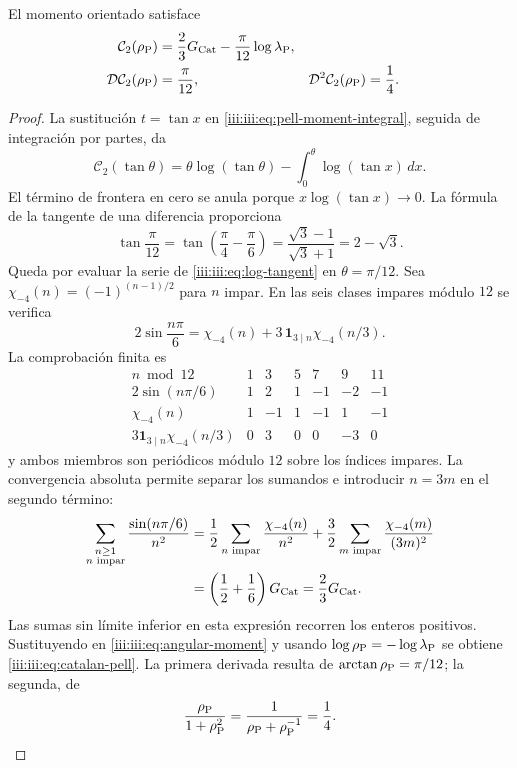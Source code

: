 \begin{theorem}
\label{iii:iii:thm:catalan-pell}
El momento orientado satisface
\begin{align}
 \mathcal C_2(\rho_{\rm P})
 &=\frac23G_{\rm Cat}-\frac{\pi}{12}\log\lambda_{\rm P},
 \label{iii:iii:eq:catalan-pell}\\
 \mathcal D\mathcal C_2(\rho_{\rm P})&=\frac{\pi}{12},&
 \mathcal D^2\mathcal C_2(\rho_{\rm P})&=\frac14.
 \label{iii:iii:eq:catalan-pell-derivatives}
\end{align}
\end{theorem}
\begin{proof}
La sustitución $t=\tan x$ en \eqref{iii:iii:eq:pell-moment-integral},
seguida de integración por partes, da
\begin{equation}
 \mathcal C_2(\tan\theta)
 =\theta\log(\tan\theta)
   -\int_0^\theta\log(\tan x)\,dx.
 \label{iii:iii:eq:angular-moment}
\end{equation}
El término de frontera en cero se anula porque $x\log(\tan x)\to0$.
La fórmula de la tangente de una diferencia proporciona
\[
 \tan\frac{\pi}{12}
 =\tan\left(\frac\pi4-\frac\pi6\right)
 =\frac{\sqrt3-1}{\sqrt3+1}=2-\sqrt3.
\]
Queda por evaluar la serie de \eqref{iii:iii:eq:log-tangent} en
$\theta=\pi/12$. Sea $\chi_{-4}(n)=(-1)^{(n-1)/2}$ para $n$ impar.
En las seis clases impares módulo $12$ se verifica
\begin{equation}
 2\sin\frac{n\pi}{6}
 =\chi_{-4}(n)+3\,\mathbf1_{3\mid n}\chi_{-4}(n/3).
 \label{iii:iii:eq:character-pell}
\end{equation}
La comprobación finita es
\[
\begin{array}{c|rrrrrr}
 n\bmod12&1&3&5&7&9&11\\ \hline
 2\sin(n\pi/6)&1&2&1&-1&-2&-1\\
 \chi_{-4}(n)&1&-1&1&-1&1&-1\\
 3\mathbf1_{3\mid n}\chi_{-4}(n/3)&0&3&0&0&-3&0
\end{array}
\]
y ambos miembros son periódicos módulo $12$ sobre los índices impares.
La convergencia absoluta permite separar los sumandos e introducir $n=3m$
en el segundo término:
\begin{align*}
 \sum_{\substack{n\geq1\\n\text{ impar}}}
       \frac{\sin(n\pi/6)}{n^2}
 &=\frac12\sum_{n\text{ impar}}\frac{\chi_{-4}(n)}{n^2}
  +\frac32\sum_{m\text{ impar}}\frac{\chi_{-4}(m)}{(3m)^2}\\
 &=\left(\frac12+\frac16\right)G_{\rm Cat}
 =\frac23G_{\rm Cat}.
\end{align*}
Las sumas sin límite inferior en esta expresión recorren los enteros
positivos. Sustituyendo en \eqref{iii:iii:eq:angular-moment} y usando
$\log\rho_{\rm P}=-\log\lambda_{\rm P}$ se obtiene
\eqref{iii:iii:eq:catalan-pell}. La primera derivada resulta de
$\arctan\rho_{\rm P}=\pi/12$; la segunda, de
\[
 \frac{\rho_{\rm P}}{1+\rho_{\rm P}^2}
 =\frac1{\rho_{\rm P}+\rho_{\rm P}^{-1}}=\frac14.
\]
\end{proof}

